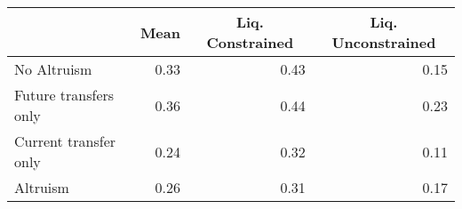 \begin{tabular}{lrrr}
\toprule
  & \multicolumn{1}{c}{Mean} & \multicolumn{1}{c}{Liq. Constrained} & \multicolumn{1}{c}{Liq. Unconstrained} \\
\midrule
No Altruism & 0.33 & 0.43 & 0.15\\
\;Future transfers only & 0.36 & 0.44 & 0.23\\
\;Current transfer only & 0.24 & 0.32 & 0.11\\
Altruism & 0.26 & 0.31 & 0.17\\
\bottomrule
\end{tabular}
